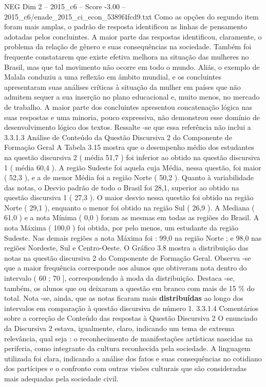 \begin{textsample}{NEG Dim 2 – 2015\_c6 – Score -3.00 – 2015\_c6/enade\_2015\_ci\_econ\_5389f4fcd9.txt}
Como as opções do segundo item foram mais amplas, o padrão de resposta identificou as linhas de pensamento adotadas pelos concluintes.
A maior parte das respostas identificou, claramente, o problema da relação de gênero e suas consequências na sociedade.
Também foi frequente constatarem que existe efetiva melhora na situação das mulheres no Brasil, mas que tal movimento não ocorre em todo o mundo.
Aliás, o exemplo de Malala conduziu a uma reflexão em âmbito mundial, e os concluintes apresentaram suas análises críticas à situação da mulher em países que não admitem sequer a sua inserção no plano educacional e, muito menos, no mercado de trabalho.
A maior parte dos concluintes apresentou concatenação lógica nas suas respostas e uma minoria, pouco expressiva, não demonstrou esse domínio de desenvolvimento lógico dos textos.
Ressalte -se que essa referência não inclui a 3.3.1.3 Análise de Conteúdo da Questão Discursiva 2 do Componente de Formação Geral A Tabela 3.15 mostra que o desempenho médio dos estudantes na questão discursiva 2 ( média 51,7 ) foi inferior ao obtido na questão discursiva 1 ( média 60,4 ).
A região Sudeste foi aquela cuja Média, nessa questão, foi maior ( 52,3 ), e a de menor Média foi a região Norte ( 50,2 ).
Quanto à variabilidade das notas, o Desvio padrão de todo o Brasil foi 28,1, superior ao obtido na questão discursiva 1 ( 27,3 ).
O maior desvio nessa questão foi obtido na região Norte ( 29,1 ), enquanto o menor foi obtido na região Sul ( 26,9 ).
A Mediana ( 61,0 ) e a nota Mínima ( 0,0 ) foram as mesmas em todas as regiões do Brasil.
A nota Máxima ( 100,0 ) foi obtida, por pelo menos, um estudante da região Sudeste.
Nas demais regiões a nota Máxima foi : 99,0 na região Norte ; e 98,0 nas regiões Nordeste, Sul e Centro-Oeste.
O Gráfico 3.8 mostra a distribuição das notas na questão discursiva 2 do Componente de Formação Geral.
Observa -se que a maior frequência corresponde aos alunos que obtiveram nota dentro do intervalo ( 60 ; 70 ], correspondendo à moda da distribuição.
Destaca -se, também, os alunos que ou deixaram a questão em branco com mais de 15 \% do total.
Nota -se, ainda, que as notas ficaram mais \textbf{distribuídas} ao longo dos intervalos em comparação à questão discursiva de número 1. 3.3.1.4 Comentários sobre a correção de Conteúdo das respostas à Questão Discursiva 2 O enunciado da Discursiva 2 estava, igualmente, claro, indicando um tema de extrema relevância, qual seja : o reconhecimento de manifestações artísticas nascidas na periferia, como integrante da cultura reconhecida pela sociedade.
A linguagem utilizada foi clara, indicando a análise dos fatos e suas consequências no cotidiano dos partícipes e o confronto com outras visões culturais que são consideradas mais adequadas pela sociedade civil.

\end{textsample}
